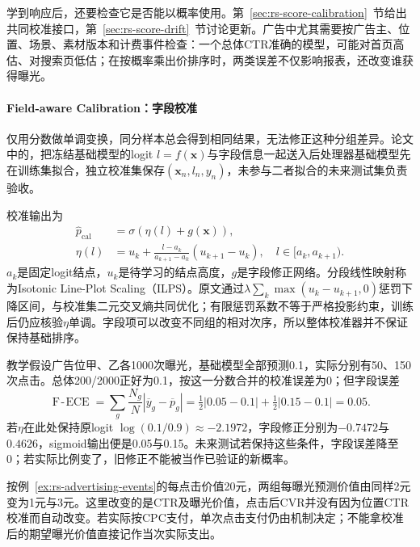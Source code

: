 学到响应后，还要检查它是否能以概率使用。第~\ref{sec:rs-score-calibration}~节给出共同校准接口，第~\ref{sec:rs-score-drift}~节讨论更新。广告中尤其需要按广告主、位置、场景、素材版本和计费事件检查：一个总体CTR准确的模型，可能对首页高估、对搜索页低估；在按概率乘出价排序时，两类误差不仅影响报表，还改变谁获得曝光。

\paragraph{Field-aware Calibration：字段校准}
\label{sec:rs-advertising-field-calibration}

仅用分数做单调变换，同分样本总会得到相同结果，无法修正这种分组差异。论文中的，把冻结基础模型的logit $l=f(\bm{x})$与字段信息一起送入后处理器基础模型先在训练集拟合，独立校准集保存$(\bm{x}_n,l_n,y_n)$，未参与二者拟合的未来测试集负责验收。

校准输出为
\begin{equation}
  \begin{aligned}
    \widehat p_{\mathrm{cal}}
       &=\sigma\!\left(\eta(l)+g(\bm{x})\right),\\
    \eta(l)&=u_k+
         \frac{l-a_k}{a_{k+1}-a_k}(u_{k+1}-u_k),
         \quad l\in[a_k,a_{k+1}).
  \end{aligned}
  \label{eq:rs-advertising-field-calibration}
\end{equation}
$a_k$是固定logit结点，$u_k$是待学习的结点高度，$g$是字段修正网络。分段线性映射称为Isotonic Line-Plot Scaling（ILPS）。原文通过$\lambda\sum_k\max(u_k-u_{k+1},0)$惩罚下降区间，与校准集二元交叉熵共同优化；有限惩罚系数不等于严格投影约束，训练后仍应核验$\eta$单调。字段项可以改变不同组的相对次序，所以整体校准器并不保证保持基础排序。

教学假设广告位甲、乙各1000次曝光，基础模型全部预测0.1，实际分别有50、150次点击。总体200/2000正好为0.1，按这一分数合并的校准误差为0；但字段误差
\[
  \operatorname{F\!-\!ECE}
   =\sum_g\frac{N_g}{N}
       \left|\overline y_g-\overline p_g\right|
   =\tfrac12|0.05-0.1|+\tfrac12|0.15-0.1|=0.05.
\]
若$\eta$在此处保持原logit $\log(0.1/0.9)\approx-2.1972$，字段修正分别为$-0.7472$与$0.4626$，sigmoid输出便是0.05与0.15。未来测试若保持这些条件，字段误差降至0；若实际比例变了，旧修正不能被当作已验证的新概率。

按例~\ref{ex:rs-advertising-events}的每点击价值20元，两组每曝光预测价值由同样2元变为1元与3元。这里改变的是CTR及曝光价值，点击后CVR并没有因为位置CTR校准而自动改变。若实际按CPC支付，单次点击支付仍由机制决定；不能拿校准后的期望曝光价值直接记作当次实际支出。

